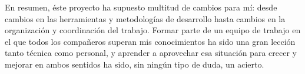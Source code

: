 En resumen, éste proyecto ha supuesto multitud de cambios para mí: desde cambios en
las herramientas y metodologías de desarrollo hasta cambios en la organización y
coordinación del trabajo.  Formar parte de un equipo de trabajo en el que todos
los compañeros superan mis conocimientos ha sido una gran lección tanto técnica como
personal, y aprender a aprovechar esa situación para crecer y mejorar en ambos sentidos
ha sido, sin ningún tipo de duda, un acierto.